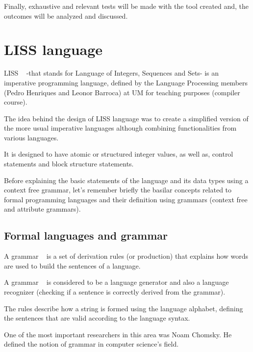 \documentclass[
  oneside,
  11pt, a4paper,
  footinclude=true,
  headinclude=true,
  cleardoublepage=empty
]{scrbook}
\begin{document}
Finally, exhaustive and relevant tests will be made with the tool created and, the outcomes will be analyzed and discussed.






\chapter{LISS language}

LISS ~\citep{CH07a} -that stands for Language of Integers, Sequences and Sets- is an imperative programming language, defined by the Language Processing members (Pedro Henriques and Leonor Barroca) at UM for teaching purposes (compiler course).

The idea behind the design of LISS language was to create a simplified version of the more usual imperative languages although combining functionalities from various languages.

It is designed to have atomic or structured integer values, as well as, control statements and block structure statements.


Before explaining the basic statements of the language and its data types using a context free grammar, let’s remember briefly the basilar concepts related to formal programming languages and their definition using grammars (context free and attribute grammars).

\section{Formal languages and grammar}

A grammar ~\citep{Chomsky62a,Gau83a,WG84a,ASU86a,Kas91c,Muchnick97,Hopcroft2006b,Grune2012a} is a set of derivation rules (or production) that explains how words are used to build the sentences of a language.

A grammar ~\citep{DJB88a,Alb91a,Kas91a,SV91a,WAGA90,Rai80a,Fil83a,OPHCC2010} is considered to be a language generator and also a language recognizer (checking if a sentence is correctly derived from the grammar).

The rules describe how a string is formed using the language alphabet, defining the sentences that are valid according to the language syntax.

One of the most important researchers in this area was Noam Chomsky. He defined the notion of grammar in computer science's field.
\end{document}
